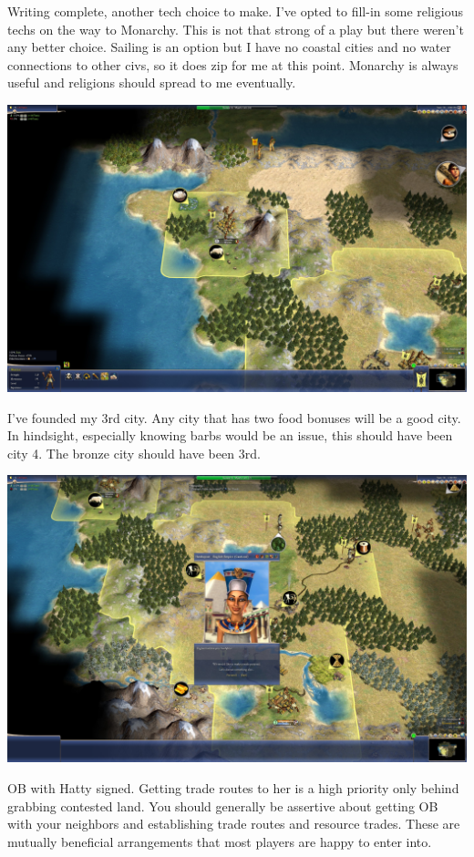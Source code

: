 \documentclass[10pt]{article}
\begin{document}
Writing complete, another tech choice to make. I've opted to fill-in some religious techs on the way to
Monarchy. This is not that strong of a play but there weren't any better choice. Sailing is an option but
I have no coastal cities and no water connections to other civs, so it does zip for me at this point. Monarchy
is always useful and religions should spread to me eventually.

\includegraphics[width=1.0\textwidth]{24}

I've founded my 3rd city. Any city that has two food bonuses will be a good city. In hindsight, especially
knowing barbs would be an issue, this should have been city 4. The bronze city should have been 3rd.

\includegraphics[width=1.0\textwidth]{25}

OB with Hatty signed. Getting trade routes to her is a high priority only behind grabbing contested land.
You should generally be assertive about getting OB with your neighbors and establishing trade routes and
resource trades. These are mutually beneficial arrangements that most players are happy to enter into.
\end{document}

